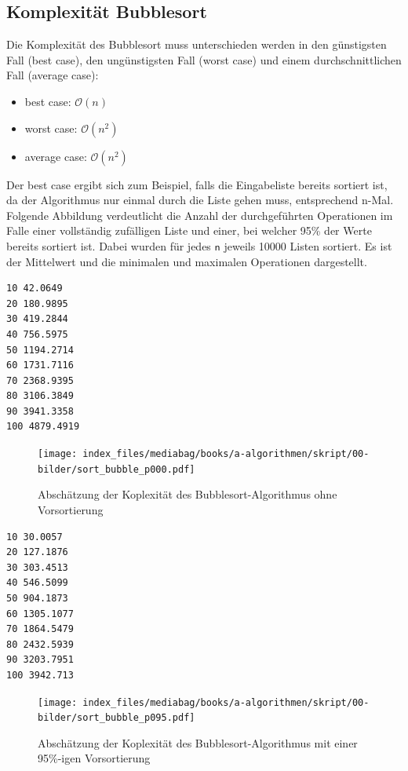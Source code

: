 \documentclass[
  letterpaper,
  DIV=11,
  numbers=noendperiod]{scrreprt}
\providecommand{\tightlist}{%
  \setlength{\itemsep}{0pt}\setlength{\parskip}{0pt}}\usepackage{longtable,booktabs,array}
\begin{document}
\subsection{Komplexität Bubblesort}\label{komplexituxe4t-bubblesort}

Die Komplexität des Bubblesort muss unterschieden werden in den
günstigsten Fall (best case), den ungünstigsten Fall (worst case) und
einem durchschnittlichen Fall (average case):

\begin{itemize}
\tightlist
\item
  best case: \(\mathcal{O} (n)\)
\item
  worst case: \(\mathcal{O} (n^2)\)
\item
  average case: \(\mathcal{O} (n^2)\)
\end{itemize}

Der best case ergibt sich zum Beispiel, falls die Eingabeliste bereits
sortiert ist, da der Algorithmus nur einmal durch die Liste gehen muss,
entsprechend n-Mal. Folgende Abbildung verdeutlicht die Anzahl der
durchgeführten Operationen im Falle einer vollständig zufälligen Liste
und einer, bei welcher 95\% der Werte bereits sortiert ist. Dabei wurden
für jedes \(\mathsf n\) jeweils 10000 Listen sortiert. Es ist der
Mittelwert und die minimalen und maximalen Operationen dargestellt.

\begin{verbatim}
10 42.0649
20 180.9895
30 419.2844
40 756.5975
50 1194.2714
60 1731.7116
70 2368.9395
80 3106.3849
90 3941.3358
100 4879.4919
\end{verbatim}

\begin{figure}[H]

{\centering \texttt{[image: index\_files/mediabag/books/a-algorithmen/skript/00-bilder/sort\_bubble\_p000.pdf]}

}

\caption{Abschätzung der Koplexität des Bubblesort-Algorithmus ohne
Vorsortierung}

\end{figure}%

\begin{verbatim}
10 30.0057
20 127.1876
30 303.4513
40 546.5099
50 904.1873
60 1305.1077
70 1864.5479
80 2432.5939
90 3203.7951
100 3942.713
\end{verbatim}

\begin{figure}[H]

{\centering \texttt{[image: index\_files/mediabag/books/a-algorithmen/skript/00-bilder/sort\_bubble\_p095.pdf]}

}

\caption{Abschätzung der Koplexität des Bubblesort-Algorithmus mit einer
95\%-igen Vorsortierung}

\end{figure}%
\end{document}
